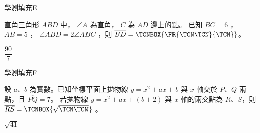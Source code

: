     \begin{QUESTION}
        \begin{ExamInfo}{99}{學測}{填充}{E}
        \end{ExamInfo}
        \begin{ExamAnsRateInfo}{31}{75}{17}{1}
        \end{ExamAnsRateInfo}
        \begin{QBODY}
            直角三角形 $ABD$ 中， $\angle A$ 為直角， $C$ 為 $AD$ 邊上的點。
			已知 $\overline{BC} = 6$ ， $\overline{AB} = 5$ ， $\angle ABD = 2 \angle ABC$ ，則 $\overline{BD} = \TCNBOX{\FR{\TCN\TCN}{\TCN}}$。
        \end{QBODY}
        \begin{QFROMS}
        \end{QFROMS}
        \begin{QTAGS}\end{QTAGS}
        \begin{QANS}
            $\dfrac{90}{7}$
        \end{QANS}
        \begin{QSOLLIST}
        \end{QSOLLIST}
        \begin{QEMPTYSPACE}
        \end{QEMPTYSPACE}
    \end{QUESTION}
    \begin{QUESTION}
        \begin{ExamInfo}{99}{學測}{填充}{F}
        \end{ExamInfo}
        \begin{ExamAnsRateInfo}{15}{40}{4}{1}
        \end{ExamAnsRateInfo}
        \begin{QBODY}
            設 $a$、$b$ 為實數。已知坐標平面上拋物線 $y=x^2 +ax+b$ 與 $x$ 軸交於 $P$、$Q$ 兩點，且 $\overline{PQ}=7$。 若拋物線 $y=x^2 +ax+(b+2)$ 與 $x$ 軸的兩交點為 $R$、$S$，則 $\overline{RS}=\TCNBOX{\sqrt{\TCN\TCN}}$ 。
        \end{QBODY}
        \begin{QFROMS}
        \end{QFROMS}
        \begin{QTAGS}\end{QTAGS}
        \begin{QANS}
            $\sqrt{41}$
        \end{QANS}
        \begin{QSOLLIST}
        \end{QSOLLIST}
        \begin{QEMPTYSPACE}
        \end{QEMPTYSPACE}
    \end{QUESTION}
